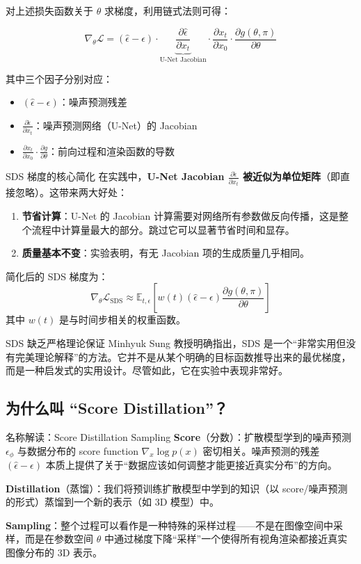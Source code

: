 \documentclass[a4paper]{article}
\begin{document}
对上述损失函数关于 $\theta$ 求梯度，利用链式法则可得：

$$
\nabla_\theta \mathcal{L} = (\hat{\epsilon} - \epsilon) \cdot \underbrace{\frac{\partial \hat{\epsilon}}{\partial x_t}}_{\text{U-Net Jacobian}} \cdot \frac{\partial x_t}{\partial x_0} \cdot \frac{\partial g(\theta, \pi)}{\partial \theta}
$$

其中三个因子分别对应：
\begin{itemize}
    \item $(\hat{\epsilon} - \epsilon)$：噪声预测残差
    \item $\frac{\partial \hat{\epsilon}}{\partial x_t}$：噪声预测网络（U-Net）的 Jacobian
    \item $\frac{\partial x_t}{\partial x_0} \cdot \frac{\partial g}{\partial \theta}$：前向过程和渲染函数的导数
\end{itemize}

\begin{importantbox}{SDS 梯度的核心简化}
在实践中，\textbf{U-Net Jacobian $\frac{\partial \hat{\epsilon}}{\partial x_t}$ 被近似为单位矩阵}（即直接忽略）。这带来两大好处：

\begin{enumerate}
    \item \textbf{节省计算}：U-Net 的 Jacobian 计算需要对网络所有参数做反向传播，这是整个流程中计算量最大的部分。跳过它可以显著节省时间和显存。
    \item \textbf{质量基本不变}：实验表明，有无 Jacobian 项的生成质量几乎相同。
\end{enumerate}

简化后的 SDS 梯度为：
$$
\nabla_\theta \mathcal{L}_{\text{SDS}} \approx \mathbb{E}_{t,\epsilon}\left[w(t)(\hat{\epsilon} - \epsilon) \frac{\partial g(\theta, \pi)}{\partial \theta}\right]
$$
其中 $w(t)$ 是与时间步相关的权重函数。
\end{importantbox}

\begin{warningbox}{SDS 缺乏严格理论保证}
Minhyuk Sung 教授明确指出，SDS 是一个``非常实用但没有完美理论解释''的方法。它并不是从某个明确的目标函数推导出来的最优梯度，而是一种启发式的实用设计。尽管如此，它在实验中表现非常好。
\end{warningbox}

\subsection{为什么叫 ``Score Distillation''？}

\begin{knowledgebox}{名称解读：Score Distillation Sampling}
\textbf{Score}（分数）：扩散模型学到的噪声预测 $\epsilon_\phi$ 与数据分布的 score function $\nabla_x \log p(x)$ 密切相关。噪声预测的残差 $(\hat{\epsilon} - \epsilon)$ 本质上提供了关于``数据应该如何调整才能更接近真实分布''的方向。

\textbf{Distillation}（蒸馏）：我们将预训练扩散模型中学到的知识（以 score/噪声预测的形式）蒸馏到一个新的表示（如 3D 模型）中。

\textbf{Sampling}：整个过程可以看作是一种特殊的采样过程——不是在图像空间中采样，而是在参数空间 $\theta$ 中通过梯度下降``采样''一个使得所有视角渲染都接近真实图像分布的 3D 表示。
\end{knowledgebox}
\end{document}
